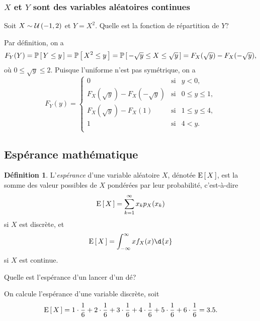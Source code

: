 \documentclass[11pt]{article}
\makeatletter
\renewcommand\P[1]{%
	\ensuremath{%
		\mathbb{P}\left[\,#1\,\right]%
	}%
}%
\newcommand\Uni[2]{%
	\ensuremath{%
		\mathcal{U}\left(#1,#2\right)%
	}%
}%
\newcommand\Esp[1]{%
	\ensuremath{%
		\mathrm{E}\left[\,#1\,\right]%
	}%
}%
\theoremstyle{remark}
\theoremstyle{definition}
\newtheorem*{@definition}{Définition}
\newenvironment{definition}{%
	\begin{@definition}%
}{%
	\end{@definition}%
	\setcounter{property}{0}%
}
\makeatother
\begin{document}
\subsubsection
	[$X$ et $Y$ sont des variables aléatoires continues]
	{\boldmath $X$ et $Y$ sont des variables aléatoires continues}
\begin{exemple}
	Soit $X\sim\Uni{-1}{2}$ et $Y=X^2$. Quelle est la fonction de répartition de
	$Y$?

	Par définition, on a
	\begin{equation*}
		F_Y(Y)
		=\P{Y\leq y}
		=\P{X^2\leq y}
		=\P{-\sqrt{y}\leq X\leq\sqrt{y}}
		=F_X(\sqrt{y})-F_X(-\sqrt{y}),
	\end{equation*}
	où $0\leq \sqrt{y}\leq 2$. Puisque l'uniforme n'est pas symétrique, on a
	\begin{equation*}
		F_Y(y)=\left\{
			\begin{matrix}
				0                            & \text{si} & y<0,\\
				F_X(\sqrt{y})-F_X(-\sqrt{y}) & \text{si} & 0\leq y\leq 1,\\
				F_X(\sqrt{y})-F_X(1)         & \text{si} & 1\leq y\leq 4,\\
				1                            & \text{si} & 4<y.\\
			\end{matrix}
		\right.
	\end{equation*}
\end{exemple}

\subsection{Espérance mathématique}
\begin{definition}
	L'\textit{espérance} d'une variable aléatoire $X$, dénotée $\Esp{X}$, est
	la somme des valeur possibles de $X$ pondérées par leur probabilité,
	c'est-à-dire
	\begin{equation*}
		\Esp{X}=\sum_{k=1}^\infty x_kp_X(x_k)
	\end{equation*}
	si $X$ est discrète, et
	\begin{equation*}
		\Esp{X}=\int_{-\infty}^\infty xf_X(x)\d{x}
	\end{equation*}
	si $X$ est continue.
\end{definition}

\begin{exemple}
	Quelle est l'espérance d'un lancer d'un dé?

	On calcule l'espérance d'une variable discrète, soit
	\begin{equation*}
		\Esp{X}=
			1\cdot\frac{1}{6}+
			2\cdot\frac{1}{6}+
			3\cdot\frac{1}{6}+
			4\cdot\frac{1}{6}+
			5\cdot\frac{1}{6}+
			6\cdot\frac{1}{6}
		=3.5.
	\end{equation*}
\end{exemple}
\end{document}
